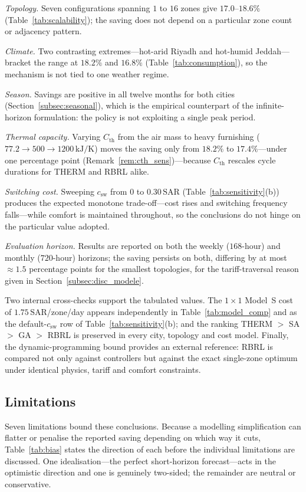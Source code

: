 \documentclass[3p,number]{elsarticle}
\let\oldsubsection\subsection
\renewcommand{\subsection}{\FloatBarrier\oldsubsection}
\newcommand{\Cth}{C_{\mathrm{th}}}
\newcommand{\csw}{c_{\mathrm{sw}}}
\newcommand{\SAR}{\text{SAR}}
\begin{document}
\emph{Topology.} Seven configurations spanning $1$ to $16$ zones give
$17.0$--$18.6\%$ (Table~\ref{tab:scalability}); the saving does not depend on a
particular zone count or adjacency pattern.

\emph{Climate.} Two contrasting extremes---hot-arid Riyadh and hot-humid
Jeddah---bracket the range at $18.2\%$ and $16.8\%$ (Table~\ref{tab:consumption}),
so the mechanism is not tied to one weather regime.

\emph{Season.} Savings are positive in all twelve months for both cities
(Section~\ref{subsec:seasonal}), which is the empirical counterpart of the
infinite-horizon formulation: the policy is not exploiting a single peak period.

\emph{Thermal capacity.} Varying $\Cth$ from the air mass to heavy furnishing
($77.2\to500\to1200\,\text{kJ/K}$) moves the saving only from $18.2\%$ to
$17.4\%$---under one percentage point (Remark~\ref{rem:cth_sens})---because
$\Cth$ rescales cycle durations for THERM and RBRL alike.

\emph{Switching cost.} Sweeping $\csw$ from $0$ to $0.30\,\SAR$
(Table~\ref{tab:sensitivity}(b)) produces the expected monotone trade-off---cost
rises and switching frequency falls---while comfort is maintained throughout, so
the conclusions do not hinge on the particular value adopted.

\emph{Evaluation horizon.} Results are reported on both the weekly
($168$-hour) and monthly ($720$-hour) horizons; the saving persists on both,
differing by at most ${\approx}1.5$ percentage points for the smallest
topologies, for the tariff-traversal reason given in
Section~\ref{subsec:disc_modele}.

Two internal cross-checks support the tabulated values. The $1\times1$ Model~S
cost of $1.75\,\SAR$/zone/day appears independently in
Table~\ref{tab:model_comp} and as the default-$\csw$ row of
Table~\ref{tab:sensitivity}(b); and the ranking THERM $>$ SA $>$ GA $>$ RBRL is
preserved in every city, topology and cost model. Finally, the
dynamic-programming bound provides an external reference: RBRL is compared not
only against controllers but against the exact single-zone optimum under
identical physics, tariff and comfort constraints.

\subsection{Limitations}
\label{subsec:disc_limits}
 
Seven limitations bound these conclusions. Because a modelling simplification
can flatter or penalise the reported saving depending on which way it cuts,
Table~\ref{tab:bias} states the direction of each before the individual
limitations are discussed. One idealisation---the perfect short-horizon forecast---acts in the optimistic
direction and one is genuinely two-sided; the remainder are neutral or
conservative.
\end{document}
